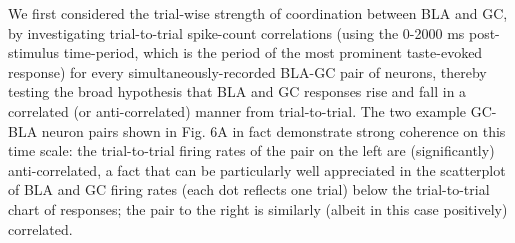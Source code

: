 \begin{refsection}
We first considered the trial-wise strength of coordination between BLA and GC, by investigating trial-to-trial spike-count correlations (using the 0-2000 ms post-stimulus time-period, which is the period of the most prominent taste-evoked response) for every simultaneously-recorded BLA-GC pair of neurons, thereby testing the broad hypothesis that BLA and GC responses rise and fall in a correlated (or anti-correlated) manner from trial-to-trial. The two example GC-BLA neuron pairs shown in Fig. 6A in fact demonstrate strong coherence on this time scale: the trial-to-trial firing rates of the pair on the left are (significantly) anti-correlated, a fact that can be particularly well appreciated in the scatterplot of BLA and GC firing rates (each dot reflects one trial) below the trial-to-trial chart of responses; the pair to the right is similarly (albeit in this case positively) correlated. 


\end{refsection}
